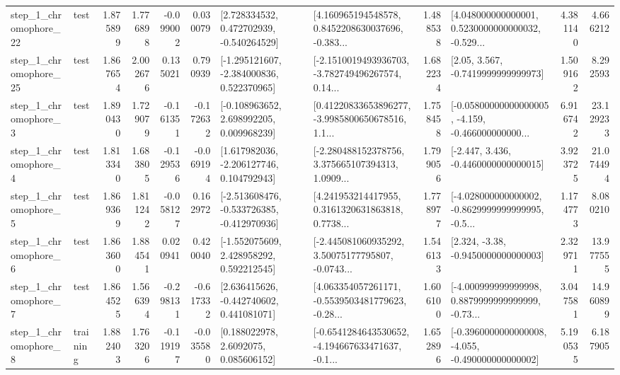 \begin{tabular}{llrrrrllrlrr}
    step\_1\_chromophore\_22 &      test &      1.875899 &    1.776898 &     -0.099002 &  0.030079 &    [2.728334532, 0.472702939, -0.540264529] &  [4.160965194548578, 0.8452208630037696, -0.383... &       1.488538 &  [4.048000000000001, 0.5230000000000032, -0.529... &            4.381140 &          4.666212 \\
    step\_1\_chromophore\_25 &      test &      1.867654 &    2.002676 &      0.135021 &  0.790939 &   [-1.295121607, -2.384000836, 0.522370965] &  [-2.1510019493936703, -3.782749496267574, 0.14... &       1.682234 &                 [2.05, 3.567, -0.7419999999999973] &            1.509162 &          8.292593 \\
     step\_1\_chromophore\_3 &      test &      1.890430 &    1.729079 &     -0.161351 & -0.172632 &    [-0.108963652, 2.698992205, 0.009968239] &  [0.41220833653896277, -3.9985800650678516, 1.1... &       1.758458 &  [-0.05800000000000005, -4.159, -0.466000000000... &            6.916742 &         23.129233 \\
     step\_1\_chromophore\_4 &      test &      1.813340 &    1.683805 &     -0.129536 & -0.069194 &    [1.617982036, -2.206127746, 0.104792943] &  [-2.280488152378756, 3.375665107394313, 1.0909... &       1.799056 &               [-2.447, 3.436, -0.4460000000000015] &            3.923725 &         21.074494 \\
     step\_1\_chromophore\_5 &      test &      1.869369 &    1.811242 &     -0.058127 &  0.162972 &  [-2.513608476, -0.533726385, -0.412970936] &  [4.241953214417955, 0.3161320631863818, 0.7738... &       1.778977 &  [-4.028000000000002, -0.8629999999999995, -0.5... &            1.174773 &          8.080210 \\
     step\_1\_chromophore\_6 &      test &      1.863600 &    1.884541 &      0.020941 &  0.420040 &    [-1.552075609, 2.428958292, 0.592212545] &  [-2.445081060935292, 3.50075177795807, -0.0743... &       1.546133 &                [2.324, -3.38, -0.9450000000000003] &            2.329711 &         13.977555 \\
     step\_1\_chromophore\_7 &      test &      1.864525 &    1.566394 &     -0.298131 & -0.617332 &    [2.636415626, -0.442740602, 0.441081071] &  [4.063354057261171, -0.5539503481779623, -0.28... &       1.606100 &  [-4.000999999999998, 0.8879999999999999, -0.73... &            3.047581 &         14.960899 \\
     step\_1\_chromophore\_8 &  training &      1.882403 &    1.763206 &     -0.119197 & -0.035580 &       [0.188022978, 2.6092075, 0.085606152] &  [-0.6541284643530652, -4.194667633471637, -0.1... &       1.652896 &  [-0.3960000000000008, -4.055, -0.490000000000002] &            5.190535 &          6.187905 \\

\end{tabular}
